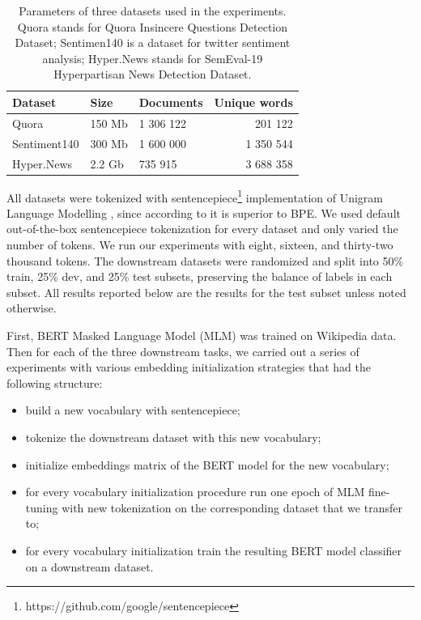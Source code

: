 \documentclass[review]{elsarticle}
\begin{document}
\begin{table}[h!]
\centering
\small{\begin{tabular}{lllr}
 Dataset & Size  & Documents & Unique words  \\
 \hline
 Quora & 150 Mb  & 1 306 122 & 201 122 \\
 Sentiment140  & 300 Mb  & 1 600 000 & 1 350 544 \\
 Hyper.News  & 2.2 Gb  & 735 915 & 3 688 358 \\
\end{tabular}}
\caption{Parameters of three datasets used in the experiments. Quora stands for Quora Insincere Questions Detection Dataset; Sentimen140 is a dataset for twitter sentiment analysis; Hyper.News stands for SemEval-19 Hyperpartisan News Detection Dataset.}
  \label{tab:dt}
\end{table}

All datasets were tokenized with sentencepiece\footnote{https://github.com/google/sentencepiece} implementation of Unigram Language Modelling \cite{kudo2018subword}, since according to \cite{bostrom2020byte} it is superior to BPE. We used default out-of-the-box sentencepiece tokenization for every dataset and only varied the number of tokens. We run our experiments with eight, sixteen, and thirty-two thousand tokens. The downstream datasets were randomized and split into 50\% train, 25\% dev, and 25\% test subsets, preserving the balance of labels in each subset. All results reported below are the results for the test subset unless noted otherwise.

First, BERT Masked Language Model (MLM) was trained on Wikipedia data. Then for each of the three downstream tasks, we carried out a series of experiments with various embedding initialization strategies that had the following structure:

\begin{itemize}
    \item build a new vocabulary with sentencepiece;
    \item tokenize the downstream dataset with this new vocabulary;
    \item initialize embeddings matrix of the BERT model for the new vocabulary;
    \item for every vocabulary initialization procedure run one epoch of MLM fine-tuning with new tokenization on the corresponding dataset that we transfer to;
    \item for every vocabulary initialization train the resulting BERT model classifier on a downstream dataset. 
\end{itemize}
\end{document}
